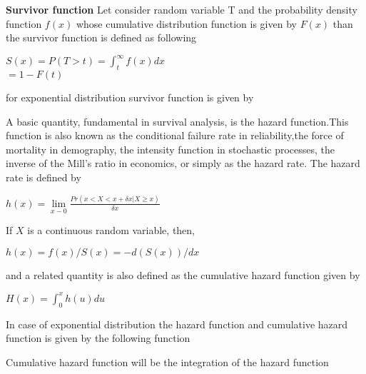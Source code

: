 \documentclass[12pt]{article}
\begin{document}
\newpage
\textbf{Survivor function}
  Let consider random variable T and the probability density function $f(x)$ whose
  cumulative distribution function is given by $F(x)$ than the survivor function is 
  defined as following
 \begin{center}
 	$S(x)=P(T>t)=\int_{t}^{\infty} f(x) dx$\\
 	$=1-F(t)$
 \begin{flushleft}
 	for exponential distribution survivor function is given by
 \end{flushleft} 
 \end{center}
\begin{Parallel}[v]{0.48\textwidth}{0.48\textwidth}
	\ParallelLText{ 
		\[
		S(x)= 
		\begin{cases}
		e^{\frac{x-\mu}{\sigma}}      & \text{iff } -\infty<\mu<\infty,x>\mu\\
		0,         & \text{otherwise} 
		\end{cases}
		\] }
\end{Parallel}

 A basic quantity, fundamental in survival analysis, is the hazard function.This function is also known as the conditional failure rate in reliability,the force of mortality in demography, the intensity function in stochastic processes, the inverse of the Mill’s ratio in economics, or simply as the hazard rate. The hazard
 rate is defined by\\
 \begin{center}
 	$h(x)=\lim\limits_{x-0}\frac{Pr(x<X<x+\delta x|X\geq x)}{\delta x} $\\
 \end{center}
 If $X$ is a continuous random variable, then,\\
 \begin{center} 
 	$h(x)=f(x)/S(x)=-d(S(x))/dx $\\
 \end{center}
 and a related quantity is also defined as the cumulative hazard function given by
 \begin{center}
 	$H(x)=\int_{0}^{x} h(u)du$
 \end{center} 
 In case of exponential distribution the hazard function and cumulative hazard function is given by the following function
 \begin{Parallel}[v]{0.48\textwidth}{0.48\textwidth}
 	\ParallelLText{ 
 		\[
 		f(x)= 
 		\begin{cases}
 		\frac{1}{\sigma}      & \text{iff } -\infty<\mu<\infty,x>\mu\\
 		0,         & \text{otherwise} 
 		\end{cases}
 		\] }
 \end{Parallel}
 \begin{flushleft}
 	Cumulative hazard function will be the integration of the hazard function
 \end{flushleft}
  
\end{document}
